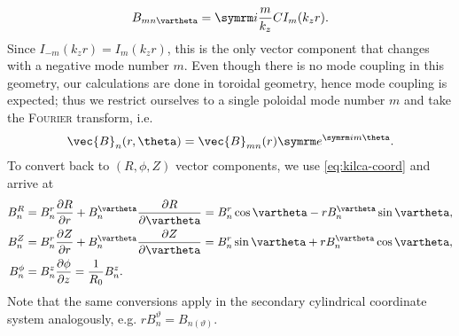 \begin{gather}
  B_{m n \vartheta} = \im \frac{m}{k_{z}} C I_m(k_{z} r). \label{eq:kilca-Btheta}
\end{gather}
Since $I_{-m}(k_{z} r) = I_{m} (k_{z} r)$, this is the only vector component that changes with a negative mode number $m$. Even though there is no mode coupling in this geometry, our calculations are done in toroidal geometry, hence mode coupling is expected; thus we restrict ourselves to a single poloidal mode number $m$ and take the \textsc{Fourier} transform, i.e.
\begin{gather}
  \vec{B}_{n} (r, \theta) = \vec{B}_{m n} (r) \e^{\im m \theta}.
\end{gather}
To convert back to $(R, \phi, Z)$ vector components, we use \cref{eq:kilca-coord} and arrive at
\begin{align}
  B_{n}^{R} &= B_{n}^{r} \pd[R]{r} + B_{n}^{\vartheta} \pd[R]{\vartheta} = B_{n}^{r} \cos \vartheta - r B_{n}^{\vartheta} \sin \vartheta, \label{eq:kilca-BR} \\
  B_{n}^{Z} &= B_{n}^{r} \pd[Z]{r} + B_{n}^{\vartheta} \pd[Z]{\vartheta} = B_{n}^{r} \sin \vartheta + r B_{n}^{\vartheta} \cos \vartheta, \label{eq:kilca-BZ} \\
  B_{n}^{\phi} &= B_{n}^{z} \pd[\phi]{z} = \frac{1}{R_{0}} B_{n}^{z}. \label{eq:kilca-Bphi}
\end{align}
Note that the same conversions apply in the secondary cylindrical coordinate system analogously, e.g. $r B_{n}^{\vartheta} = B_{n (\vartheta)}$.


